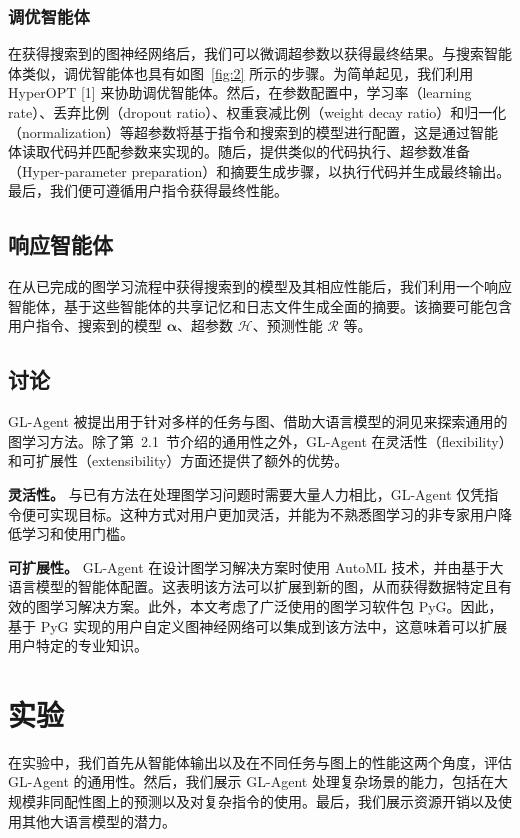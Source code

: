 \documentclass[11pt,UTF8,fontset=fandol]{ctexart}
\begin{document}
\subsubsection{调优智能体}
在获得搜索到的图神经网络后，我们可以微调超参数以获得最终结果。与搜索智能体类似，调优智能体也具有如图~\ref{fig:2} 所示的步骤。为简单起见，我们利用 HyperOPT [1] 来协助调优智能体。然后，在参数配置中，学习率（learning rate）、丢弃比例（dropout ratio）、权重衰减比例（weight decay ratio）和归一化（normalization）等超参数将基于指令和搜索到的模型进行配置，这是通过智能体读取代码并匹配参数来实现的。随后，提供类似的代码执行、超参数准备（Hyper-parameter preparation）和摘要生成步骤，以执行代码并生成最终输出。最后，我们便可遵循用户指令获得最终性能。

\subsection{响应智能体}

在从已完成的图学习流程中获得搜索到的模型及其相应性能后，我们利用一个响应智能体，基于这些智能体的共享记忆和日志文件生成全面的摘要。该摘要可能包含用户指令、搜索到的模型 $\bm{\alpha}$、超参数 $\mathcal{H}$、预测性能 $\mathcal{R}$ 等。

\subsection{讨论}

GL-Agent 被提出用于针对多样的任务与图、借助大语言模型的洞见来探索通用的图学习方法。除了第~2.1~节介绍的通用性之外，GL-Agent 在灵活性（flexibility）和可扩展性（extensibility）方面还提供了额外的优势。

\textbf{灵活性。} 与已有方法在处理图学习问题时需要大量人力相比，GL-Agent 仅凭指令便可实现目标。这种方式对用户更加灵活，并能为不熟悉图学习的非专家用户降低学习和使用门槛。

\textbf{可扩展性。} GL-Agent 在设计图学习解决方案时使用 AutoML 技术，并由基于大语言模型的智能体配置。这表明该方法可以扩展到新的图，从而获得数据特定且有效的图学习解决方案。此外，本文考虑了广泛使用的图学习软件包 PyG。因此，基于 PyG 实现的用户自定义图神经网络可以集成到该方法中，这意味着可以扩展用户特定的专业知识。

\section{实验}

在实验中，我们首先从智能体输出以及在不同任务与图上的性能这两个角度，评估 GL-Agent 的通用性。然后，我们展示 GL-Agent 处理复杂场景的能力，包括在大规模非同配性图上的预测以及对复杂指令的使用。最后，我们展示资源开销以及使用其他大语言模型的潜力。
\end{document}
